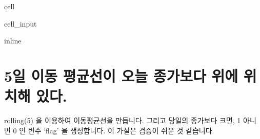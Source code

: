 \documentclass[letterpaper,10pt,english]{jupyterBook}
\begin{document}
\begin{sphinxuseclass}{cell}\begin{sphinxVerbatimInput}

\begin{sphinxuseclass}{cell_input}
\begin{sphinxVerbatim}[commandchars=\\\{\}]
   
 inline
   
   
   
 

  
\end{sphinxVerbatim}

\end{sphinxuseclass}\end{sphinxVerbatimInput}

\end{sphinxuseclass}

\section{5일 이동 평균선이 오늘 종가보다 위에 위치해 있다.}
\label{\detokenize{chapter5/5.1.2_Hypothesis_2:id1}}\label{\detokenize{chapter5/5.1.2_Hypothesis_2::doc}}
\sphinxAtStartPar
rolling(5) 을 이용하여 이동평균선을 만듭니다. 그리고 당일의 종가보다 크면, 1 아니면 0 인 변수 ‘flag’ 을 생성합니다. 이 가설은 검증이 쉬운 것 같습니다.
\end{document}
